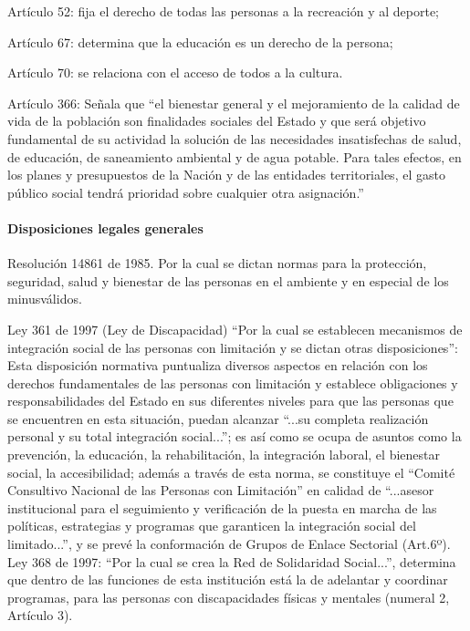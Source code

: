 \documentclass[a4paper, 12pt, oneside]{article}
\begin{document}
	Artículo 52: fija el derecho de todas las personas a la recreación y al deporte;

	Artículo 67: determina que la educación es un derecho de la persona;

	Artículo 70: se relaciona con el acceso de todos a la cultura.

	Artículo 366: Señala que “el bienestar general y el mejoramiento de la calidad de vida de la población son finalidades sociales del Estado y que será objetivo fundamental de su actividad la solución de las necesidades insatisfechas de salud, de educación, de saneamiento ambiental y de agua potable. Para tales efectos, en los planes y presupuestos de la Nación y de las entidades territoriales, el gasto público social tendrá prioridad sobre cualquier otra asignación.”

	\paragraph{Disposiciones legales generales}

	Resolución 14861 de 1985. Por la cual se dictan normas para la protección, seguridad, salud y bienestar de las personas en el ambiente y en especial de los minusválidos.

	Ley 361 de 1997 (Ley de Discapacidad) “Por la cual se establecen mecanismos de integración social de las personas con limitación y se dictan otras disposiciones”: Esta disposición normativa puntualiza diversos aspectos en relación con los derechos fundamentales de las personas con limitación y establece obligaciones y responsabilidades del Estado en sus diferentes niveles para que las personas que se encuentren en esta situación, puedan alcanzar “...su completa realización personal y su total integración social...”; es así como se ocupa de asuntos como la prevención, la educación, la rehabilitación, la integración laboral, el bienestar social, la accesibilidad; además a través de esta norma, se constituye el “Comité Consultivo Nacional de las Personas con Limitación” en calidad de “...asesor institucional para el seguimiento y verificación de la puesta en marcha de las políticas, estrategias y programas que garanticen la integración social del limitado...”, y se prevé la conformación de Grupos de Enlace Sectorial (Art.6º).
	Ley 368 de 1997: “Por la cual se crea la Red de Solidaridad Social...”, determina que dentro de las funciones de esta institución está la de adelantar y coordinar programas, para las personas con discapacidades físicas y mentales (numeral 2, Artículo 3).
\end{document}
